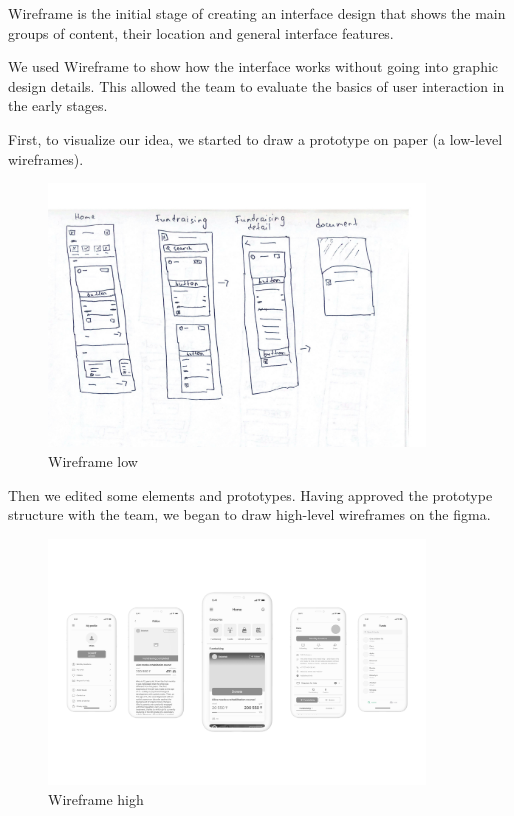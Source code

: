 Wireframe is the initial stage of creating an interface design that shows the main groups of
content, their location and general interface features.

We used Wireframe to show how the interface works without going into graphic design details.
This allowed the team to evaluate the basics of user interaction in the early stages.

First, to visualize our idea, we started to draw a prototype on paper (a low-level wireframes).

\begin{figure}[h]
    \centering
    \includegraphics[width=10cm]{figures/userInterface/wireframe_low-fi_1.jpg}
    \caption{Wireframe low}
    \label{fig:wireframelow}
\end{figure}

Then we edited some elements and prototypes. Having approved the prototype structure with
the team, we began to draw high-level wireframes on the figma.

\begin{figure}[h]
    \centering
    \includegraphics[width=10cm]{figures/userInterface/wireframe_hi-fi_1.jpg}
    \caption{Wireframe high}
    \label{fig:wireframehigh}
\end{figure}

